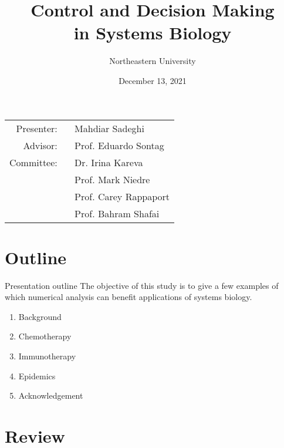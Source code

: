 \documentclass[10pt]{beamer}
\title[Proposal Review]{Control and Decision Making \\ in Systems Biology}
\author{Northeastern University}
\date{December 13, 2021}
\begin{document}
\begin{frame}
	\maketitle
	\small \hspace{3cm}
	{\begin{tabular}{r@{}l}
			Presenter: \ & Mahdiar Sadeghi \\
			Advisor:   \  & Prof. Eduardo Sontag \\
			Committee: \  & Dr. Irina Kareva \\
			& Prof. Mark Niedre \\
			& Prof. Carey Rappaport \\
			& Prof. Bahram Shafai
		\end{tabular}
	}
\end{frame}

\section{Outline}

\begin{frame}{Presentation outline}
	The objective of this study is to give a few examples of which numerical analysis can benefit applications of systems biology.
	\vspace{15pt}
    \begin{enumerate}
    	\item Background
    	\item Chemotherapy
    	\item Immunotherapy
    	\item Epidemics
    	\item Acknowledgement
    \end{enumerate}
\end{frame}

\section{Review}
\end{document}
